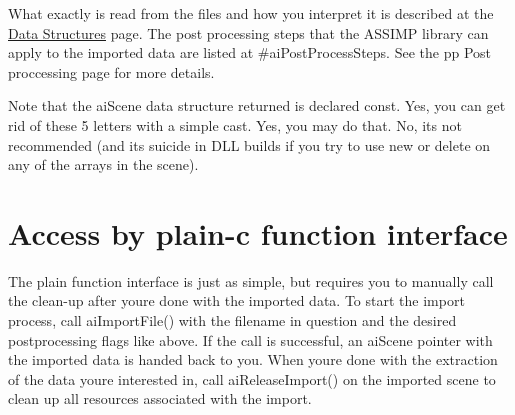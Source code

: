 What exactly is read from the files and how you interpret it is described at the \hyperlink{data}{Data Structures} page.  The post processing steps that the A\+S\+S\+I\+M\+P library can apply to the imported data are listed at \#ai\+Post\+Process\+Steps. See the pp Post proccessing page for more details.

Note that the ai\+Scene data structure returned is declared \textquotesingle{}const\textquotesingle{}. Yes, you can get rid of these 5 letters with a simple cast. Yes, you may do that. No, it\textquotesingle{}s not recommended (and it\textquotesingle{}s suicide in D\+L\+L builds if you try to use new or delete on any of the arrays in the scene).\hypertarget{usage_access_c}{}\section{Access by plain-\/c function interface}\label{usage_access_c}
The plain function interface is just as simple, but requires you to manually call the clean-\/up after you\textquotesingle{}re done with the imported data. To start the import process, call ai\+Import\+File() with the filename in question and the desired postprocessing flags like above. If the call is successful, an ai\+Scene pointer with the imported data is handed back to you. When you\textquotesingle{}re done with the extraction of the data you\textquotesingle{}re interested in, call ai\+Release\+Import() on the imported scene to clean up all resources associated with the import.

